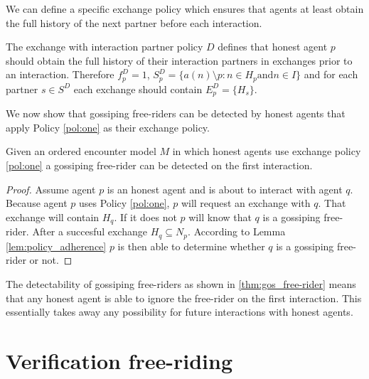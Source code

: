 We can define a specific exchange policy which ensures that agents at least obtain the full history 
of the next partner before each interaction. 

\begin{pol}
    \label{pol:one}
    The exchange with interaction partner policy $D$ defines that honest agent $p$ should obtain the full 
    history of their interaction partners in exchanges prior to an interaction. Therefore 
    $f^D_p=1$, $S^D_p = \{ a(n) \setminus p : n \in H_p \text{and} n \in I \}$
    and for each partner $s \in S^D$ each exchange should contain $E^D_p = \{ H_s \}$.
\end{pol}

We now show that gossiping free-riders can be detected by honest agents that apply Policy \ref{pol:one}
as their exchange policy.
\begin{thm}
    \label{thm:gos_free-rider}
    Given an ordered encounter model $M$ in which honest agents use exchange policy \ref{pol:one}
    a gossiping free-rider can be detected on the first interaction.
\end{thm}
\begin{proof}
    Assume agent $p$ is an honest agent and is about to interact with agent $q$. Because agent $p$
    uses Policy \ref{pol:one}, $p$ will request an exchange with $q$. That exchange will contain 
    $H_q$. If it does not $p$ will know that $q$ is a gossiping free-rider. After a succesful
    exchange $H_q \subseteq N_p$. According to Lemma \ref{lem:policy_adherence} $p$ is then able to
    determine whether $q$ is a gossiping free-rider or not. 
\end{proof}

The detectability of gossiping free-riders as shown in \ref{thm:gos_free-rider} means that any 
honest agent is able to ignore the free-rider on the first interaction. This essentially takes away
any possibility for future interactions with honest agents. 

\section{Verification free-riding}